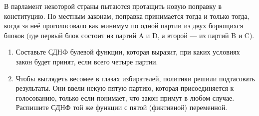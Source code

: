 \question
В парламент некоторой страны пытаются протащить новую поправку в конституцию. По местным законам, поправка принимается тогда и только тогда, когда за неё проголосовало как минимум по одной партии из двух борющихся блоков (где первый блок состоит из партий A и D, а второй — из партий B и C).

\begin{enumerate}
    \item Составьте СДНФ булевой функции, которая выразит, при каких условиях закон будет принят, если всего четыре партии.
    \item Чтобы выглядеть весомее в глазах избирателей, политики решили подтасовать результаты.  Они ввели некую пятую партию, которая присоединяется к голосованию, только если понимает, что закон примут в любом случае. Распишите СДНФ той же функции с пятой (фиктивной) переменной.
\end{enumerate}
